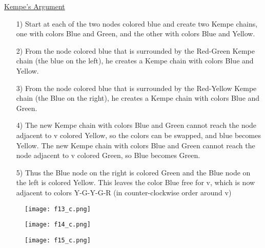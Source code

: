 \documentclass[12pt]{beamer}
\begin{document}
\begin{frame}
\underline{Kempe's Argument}
\begin{enumerate}

\item[1)] Start at each of the two nodes colored blue and create two Kempe chains, one with colors Blue and Green, and the other with colors Blue and Yellow. 

\item[2)] From the node colored blue that is surrounded by the Red-Green Kempe chain (the blue on the left), he creates a Kempe chain with colors Blue and Yellow.

\item[3)] From the node colored blue that is surrounded by the Red-Yellow Kempe chain (the Blue on the right), he creates a Kempe chain with colors Blue and Green.

\end{enumerate}
\end{frame}

\begin{frame}
\begin{enumerate}
\item[4)] The new Kempe chain with colors Blue and Green cannot reach the node adjacent to v colored Yellow, so the colors can be swapped, and blue becomes Yellow.  The new Kempe chain with colors Blue and Green cannot reach the node adjacent to v colored Green, so Blue becomes Green.

\item[5)] Thus the Blue node on the right is colored Green and the Blue node on the left is colored Yellow.  This leaves the color Blue free for v, which is now adjacent to colors Y-G-Y-G-R (in counter-clockwise order around v)
\end{enumerate}
\end{frame}

\begin{frame}
\begin{figure}
\texttt{[image: f13\_c.png]}
\end{figure}
\end{frame}

\begin{frame}
\begin{figure}
\texttt{[image: f14\_c.png]}
\end{figure}
\end{frame}

\begin{frame}
\begin{figure}
\texttt{[image: f15\_c.png]}
\end{figure}
\end{frame}
\end{document}
